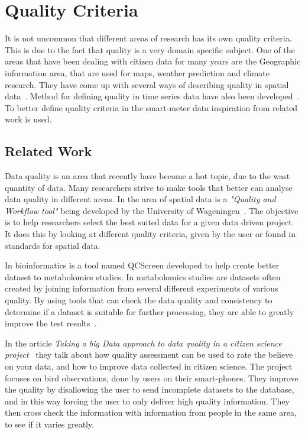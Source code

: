 \section{Quality Criteria}
It is not uncommon that different areas of research has its own quality criteria. This is due to the fact that quality is a very domain specific subject. One of the areas that have been dealing with citizen data for many years are the Geographic information area, that are used for maps, weather prediction and climate research. They have come up with several ways of describing quality in spatial data~\cite{RefWorks:7}. Method for defining quality in time series data have also been developed~\cite{RefWorks:6}. To better define quality criteria in the smart-meter data inspiration from related work is used.

\subsection{Related Work}
Data quality is an area that recently have become a hot topic, due to the wast quantity of data. Many researchers strive to make tools that better can analyse data quality in different areas. In the area of spatial data is a \emph{"Quality and Workflow tool"} being developed by the University of Wageningen~\citep{RefWorks:8}. The objective is to help researchers select the best suited data for a given data driven project. It does this by looking at different quality criteria, given by the user or found in standards for spatial data. 

In bioinformatics is a tool named QCScreen developed to help create better dataset to metabolomics studies. In metabolomics studies are datasets often created by joining information from several different experiments of various quality. By using tools that can check the data quality and consistency to determine if a dataset is suitable for further processing, they are able to greatly improve the test results~\citep{RefWorks:9}.
 
In the article \emph{Taking a big Data approach to data quality in a citizen science project}~\citep{RefWorks:2} they talk about how quality assessment can be used to rate the believe on your data, and how to improve data collected in citizen science. The project focuses on bird observations, done by users on their smart-phones. They improve the quality by disallowing the user to send incomplete datasets to the database, and in this way forcing the user to only deliver high quality information. They then cross check the information with information from people in the same area, to see if it varies greatly. 

